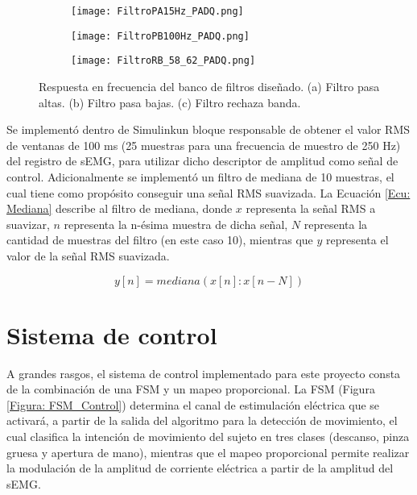 \begin{figure}[htbp]
	\centering
	\begin{subfigure}[htbp]{0.7\textwidth}
		\texttt{[image: FiltroPA15Hz\_PADQ.png]}
		\caption{}
		\label{Figura: FiltroPA}
	\end{subfigure}
	
	\begin{subfigure}[htnp]{0.7\textwidth}
		\texttt{[image: FiltroPB100Hz\_PADQ.png]}
		\caption{}
		\label{Figura: FiltroPB}
	\end{subfigure}
	
	\begin{subfigure}[htbp]{0.7\textwidth}
		\texttt{[image: FiltroRB\_58\_62\_PADQ.png]}
		\caption{}
		\label{Figura: FiltroRB}
	\end{subfigure}
	\caption[Respuesta en frecuencia del banco de filtros diseñado]{Respuesta en frecuencia del banco de filtros diseñado. (a) Filtro pasa altas. (b) Filtro pasa bajas. (c) Filtro rechaza banda.}
	\label{Figura: Freqz_Filtros}
\end{figure}

Se implementó dentro de Simulink\textregistered \;un bloque responsable de obtener el valor RMS de ventanas de 100 ms (25 muestras para una frecuencia de muestro de 250 Hz) del registro de sEMG, para utilizar dicho descriptor de amplitud como señal de control. Adicionalmente se implementó un filtro de mediana de 10 muestras, el cual tiene como propósito conseguir una señal RMS suavizada. La Ecuación \ref{Ecu: Mediana} describe al filtro de mediana, donde $x$ representa la señal RMS a suavizar, $n$ representa la n-ésima muestra de dicha señal, $N$ representa la cantidad de muestras del filtro (en este caso 10), mientras que $y$ representa el valor de la señal RMS suavizada.

\begin{equation}
	y[n] = mediana(x[n]:x[n-N])
	\label{Ecu: Mediana}
\end{equation}


\newpage
\section{Sistema de control}
A grandes rasgos, el sistema de control implementado para este proyecto consta de la combinación de una FSM y un mapeo proporcional. La FSM (Figura \ref{Figura: FSM_Control})  determina el canal de estimulación eléctrica que se activará, a partir de la salida del algoritmo para la detección de movimiento, el cual clasifica la intención de movimiento del sujeto en tres clases (descanso, pinza gruesa y apertura de mano), mientras que el mapeo proporcional permite realizar la modulación de la amplitud de corriente eléctrica a partir de la amplitud del sEMG.

